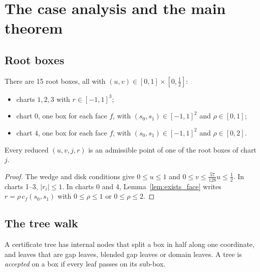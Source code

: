 \chapter{The case analysis and the main theorem}
\label{chap:main}

\section{Root boxes}

\begin{definition}
\label{def:root_boxes}
\leanok
{}
There are 15 root boxes, all with $(u, v) \in [0, 1] \times [0, \frac12]$:
\begin{itemize}
\item charts $1, 2, 3$ with $r \in [-1, 1]^3$;
\item chart $0$, one box for each face $f$, with $(s_0, s_1) \in [-1,1]^2$ and
  $\rho \in [0, 1]$;
\item chart $4$, one box for each face $f$, with $(s_0, s_1) \in [-1,1]^2$ and
  $\rho \in [0, 2]$.
\end{itemize}
\end{definition}

\begin{lemma}[Coverage]
\label{lem:cover}
\leanok
{}
Every reduced $(u, v, j, r)$ is an admissible point of one of the root boxes of chart $j$.
\end{lemma}
\begin{proof}
\leanok
The wedge and disk conditions give $0 \le u \le 1$ and $0 \le v \le \frac{57}{128}u \le \frac12$.
In charts 1--3, $|r_i| \le 1$. In charts 0 and 4, Lemma~\ref{lem:exists_face} writes
$r = \rho\, c_f(s_0, s_1)$ with $0 \le \rho \le 1$ or $0 \le \rho \le 2$.
\end{proof}

\section{The tree walk}

\begin{definition}
\label{def:kcheck}
\leanok
{}
A certificate tree has internal nodes that split a box in half along one coordinate,
and leaves that are gap leaves, blended gap leaves or domain leaves. A tree is \emph{accepted} on a box if
every leaf passes on its sub-box.
\end{definition}

